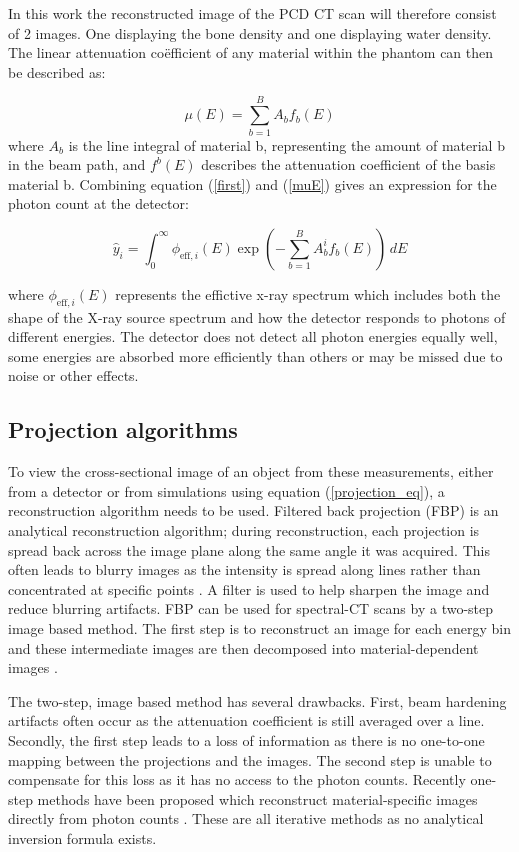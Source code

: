\documentclass{article}
\begin{document}
In this work the reconstructed image of the PCD CT scan will therefore consist of 2 images. One displaying the bone density and one displaying water density. The linear attenuation coëfficient of any material within the phantom can then be described as:

\begin{equation}
\label{muE}
\mu(E) = \sum_{b=1}^{B} A_b f_b(E)
\end{equation}
where $A_b$ is the line integral of material b, representing the amount of material b in the beam path, and $f^b(E)$ describes the attenuation coefficient of the basis material b. Combining equation (\ref{first}) and (\ref{muE}) gives an expression for the photon count at the detector:

\begin{equation}
\hat{y}_i = \int_0^{\infty} \phi_{\text{eff},i}(E) \exp\left( - \sum_{b=1}^{B} A_b^i f_b(E) \right) \, dE
\end{equation}

where $\phi_{\text{eff},i}(E)$ represents the effictive x-ray spectrum which includes both the shape of the X-ray source spectrum and how the detector responds to photons of different energies. The detector does not detect all photon energies equally well, some energies are absorbed more efficiently than others or may be missed due to noise or other effects.

\subsection{Projection algorithms}

To view the cross-sectional image of an object from these measurements, either from a detector or from simulations using equation (\ref{projection_eq}), a reconstruction algorithm needs to be used. Filtered back projection (FBP) is an analytical reconstruction algorithm; during reconstruction, each projection is spread back across the image plane along the same angle it was acquired. This often leads to blurry images as the intensity is spread along lines rather than concentrated at specific points \citep{zeng2001image}. A filter is used to help sharpen the image and reduce blurring artifacts. FBP can be used for spectral-CT scans by a two-step image based method. The first step is to reconstruct an image for each energy bin and these intermediate images are then decomposed into material-dependent images \citep{mory2018comparison}.

The two-step, image based method has several drawbacks. First, beam hardening artifacts often occur as the attenuation coefficient is still averaged over a line. Secondly, the first step leads to a loss of information as there is no one-to-one mapping between the projections and the images. The second step is unable to compensate for this loss as it has no access to the photon counts. Recently one-step methods have been proposed which reconstruct material-specific images directly from photon counts \citep{mechlem2018joint}. These are all iterative methods as no analytical inversion formula exists.
\end{document}
